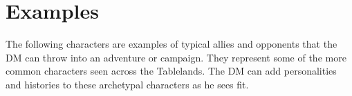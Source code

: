 


\section{Examples}
The following characters are examples of typical allies and opponents that the DM can throw into an adventure or campaign. They represent some of the more common characters seen across the Tablelands. The DM can add personalities and histories to these archetypal characters as he sees fit.

